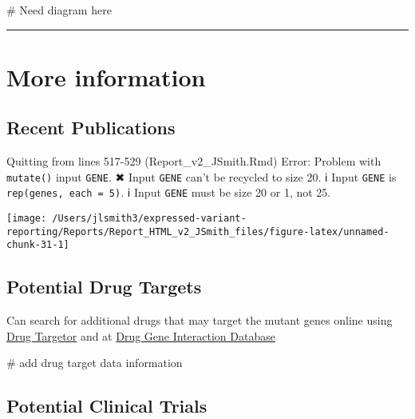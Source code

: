 \documentclass[
]{article}
\newenvironment{Shaded}{\begin{snugshade}}{\end{snugshade}}
\newcommand{\CommentTok}[1]{\textcolor[rgb]{0.48,0.49,0.49}{#1}}
\begin{document}
\begin{Shaded}
\begin{Highlighting}[]
\CommentTok{\# Need diagram here}
\end{Highlighting}
\end{Shaded}

\begin{center}\rule{0.5\linewidth}{0.5pt}\end{center}

\hypertarget{more-information}{%
\section{More information}\label{more-information}}

\hypertarget{recent-publications}{%
\subsection{Recent Publications}\label{recent-publications}}

Quitting from lines 517-529 (Report\_v2\_JSmith.Rmd) Error: Problem with
\texttt{mutate()} input \texttt{GENE}. ✖ Input \texttt{GENE} can't be
recycled to size 20. ℹ Input \texttt{GENE} is
\texttt{rep(genes,\ each\ =\ 5)}. ℹ Input \texttt{GENE} must be size 20
or 1, not 25.

\begin{center}\texttt{[image: /Users/jlsmith3/expressed-variant-reporting/Reports/Report\_HTML\_v2\_JSmith\_files/figure-latex/unnamed-chunk-31-1]} \end{center}

\hypertarget{potential-drug-targets}{%
\subsection{Potential Drug Targets}\label{potential-drug-targets}}

Can search for additional drugs that may target the mutant genes online
using \href{http://drugtargetor.com/}{Drug Targetor} and at
\href{https://www.dgidb.org/}{Drug Gene Interaction Database}

\begin{Shaded}
\begin{Highlighting}[]
\CommentTok{\# add drug target data information}
\end{Highlighting}
\end{Shaded}

\hypertarget{potential-clinical-trials}{%
\subsection{Potential Clinical Trials}\label{potential-clinical-trials}}
\end{document}

